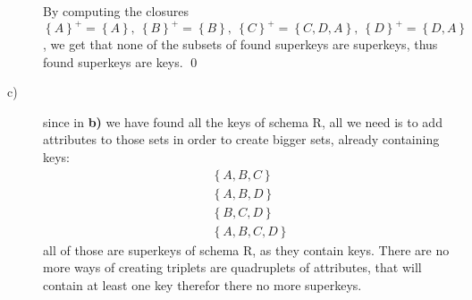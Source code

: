 \documentclass[a4paper]{article}
\newcommand{\set}[1]{\left\{#1\right\}}
\newenvironment{answer}%
{\begin{framed}%
\vspace{0.5cm}}%
{\end{framed}\vspace{0.5cm}}
\begin{document}
\begin{answer}
\begin{description}
			By computing the closures $\set{A}^+ = \set{A},\ \set{B}^+=\set{B},\ \set{C}^+=\set{C,D,A},\ \set{D}^+=\set{D,A}$, we get that none of the subsets of found superkeys are superkeys, thus found superkeys are keys. \qed 
			\item[c)] since in \textbf{b)} we have found all the keys of schema R, all we need is to add attributes to those sets in order to create bigger sets, already containing keys:
			\begin{align*}
				\set{A,B,C} \\
				\set{A,B,D} \\
				\set{B,C,D} \\
				\set{A,B,C,D}
			\end{align*}
			all of those are superkeys of schema R, as they contain keys. There are no more ways of creating triplets are quadruplets of attributes, that will contain at least one key therefor there no more superkeys.
		\end{description}
	\end{answer}
\end{document}
